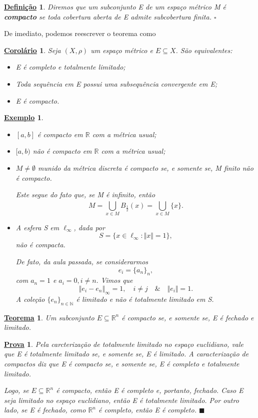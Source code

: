 \documentclass{article}
\newtheorem*{def*}{\underline{Defini\c c\~ao}}
\newtheorem*{theorem*}{\underline{Teorema}}
\newtheorem*{crl*}{\underline{Corolário}}
\newtheorem{example}{\underline{Exemplo}}
\newtheorem*{proof*}{\underline{Prova}}
\renewcommand\qedsymbol{$\blacksquare$}
\begin{document}
 \begin{def*}
  Diremos que um subconjunto E de um espaço métrico M é \textbf{compacto} se toda cobertura aberta de E admite subcobertura finita. \(\square\)
 \end{def*}
 De imediato, podemos reescrever o teorema como
 \begin{crl*}
  Seja \((X, \rho )\) um espaço métrico e \(E\subseteq X\). São equivalentes:
 \begin{itemize}
  \item[1)] E é completo e totalmente limitado;
  \item[2)] Toda sequência em E possui uma subsequência convergente em E;
  \item[3)] E é compacto.
 \end{itemize}
 \end{crl*}
 \begin{example}
  \begin{itemize}
    \item[1)] \([a, b]\) é compacto em \(\mathbb{R}\) com a métrica usual;
    \item[2)] \([a, b)\) não é compacto em \(\mathbb{R}\) com a métrica usual;
    \item[3)] \(M \neq\emptyset\) munido da métrica discreta é compacto se, e somente se, 
  M finito não é compacto.

    Este segue do fato que, se M é infinito, então 
    \[
      M = \bigcup_{x\in M}^{}B_{\frac{1}{2}}(x) = \bigcup_{x\in M}^{}\{x\}.
    \]
    \item[4)] A esfera S em \(\ell_{\infty}\), dada por 
    \[
      S = \{x\in \ell_{\infty}: \Vert x \Vert = 1\},
    \]
  não é compacta.

    De fato, da aula passada, se considerarmos 
      \[
        e_{i} = \{a_{n}\}_{n},
      \]
  com \(a_{n} = 1\) e \(a_{i} = 0, i\neq n.\) Vimos que 
    \[
      \Vert e_{i}-e_{n} \Vert_{\infty} = 1,\quad i\neq j\quad\&\quad \Vert e_{i} \Vert = 1.
    \]
  A coleção \(\{e_{n}\}_{n\in \mathbb{N}}\) é limitado e não é totalmente limitado em S.
  \end{itemize}
 \end{example}
\begin{theorem*}
  Um subconjunto \(E\subseteq \mathbb{R}^{n}\) é compacto se, e somente se, E é fechado e limitado.
\end{theorem*}
\begin{proof*}
  Pela carcterização de totalmente limitado no espaço euclidiano, vale que E é totalmente limitado se, e somente se, E é limitado.
A caracterização de compactos diz que E é compacto se, e somente se, E é completo e totalmente limitado.

  Logo, se \(E\subseteq \mathbb{R}^{n}\) é compacto, então E é completo e, portanto, fechado. Caso E seja limitado no espaço euclidiano,
então E é totalmente limitado. Por outro lado, se E é fechado, como \(\mathbb{R}^{n}\) é completo, então E é completo. \qedsymbol
\end{proof*}
\end{document}
